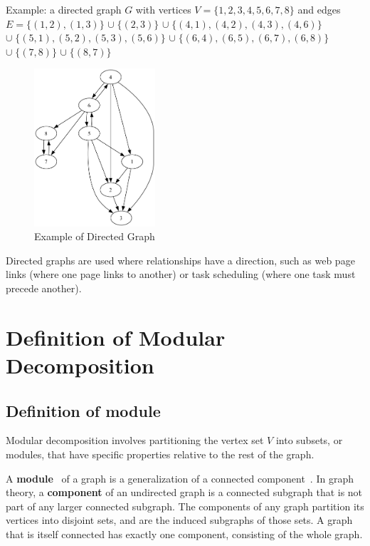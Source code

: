 Example: a directed graph $G$ with vertices $V = \{1, 2, 3, 4, 5, 6, 7, 8\}$ and edges \\
$E = \{(1, 2), (1, 3)\}$
$\cup \; \{(2, 3)\}$
$\cup \; \{(4 , 1), (4, 2), (4, 3), (4, 6)\}$
$\cup \; \{(5 , 1), (5, 2), (5, 3), (5, 6)\}$
$\cup \; \{(6, 4), (6, 5), (6, 7), (6, 8)\}$
$\cup \; \{(7, 8)\}$
$\cup \; \{(8, 7)\}$

\begin{figure}[!h]
    \centering
    \includegraphics[width=0.40\textwidth]{images/graphs/digraph_ex1_without_label}
    \caption{Example of Directed Graph}
    \label{fig:example-directed-graph}
\end{figure}

Directed graphs are used where relationships have a direction, such as web page links (where one page links to another) or task scheduling (where one task must precede another).


\section{Definition of Modular Decomposition}\label{sec:definition-of-modular-decomposition}

\subsection*{Definition of module}\label{subsec:definition-of-module}

Modular decomposition involves partitioning the vertex set $V$ into subsets, or modules, that have specific properties relative to the rest of the graph.

A \textbf{module}~\cite{mdwikipedia} of a graph is a generalization of a connected component~\cite{componentwikipedia}.
In graph theory, a \textbf{component} of an undirected graph is a connected subgraph that is not part of any larger connected subgraph.
The components of any graph partition its vertices into disjoint sets, and are the induced subgraphs of those sets.
A graph that is itself connected has exactly one component, consisting of the whole graph.


